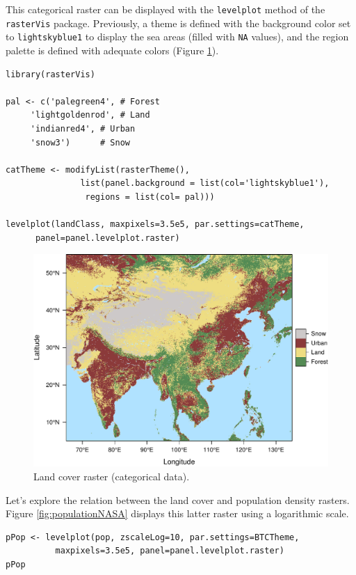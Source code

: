 This categorical raster can be displayed with the \texttt{levelplot} method
of the \texttt{rasterVis} package. Previously, a theme is defined with the
background color set to \texttt{lightskyblue1} to display the sea areas
(filled with \texttt{NA} values), and the region palette is defined with
adequate colors (Figure \ref{fig:landClass}).


\lstset{language=R,numbers=none}
\begin{lstlisting}
library(rasterVis)

pal <- c('palegreen4', # Forest
	 'lightgoldenrod', # Land
	 'indianred4', # Urban
	 'snow3')      # Snow

catTheme <- modifyList(rasterTheme(),
		       list(panel.background = list(col='lightskyblue1'),
			    regions = list(col= pal)))

levelplot(landClass, maxpixels=3.5e5, par.settings=catTheme,
	  panel=panel.levelplot.raster)
\end{lstlisting}

\begin{figure}[htb]
\centering
\includegraphics[width=.9\linewidth]{figs/landClass.pdf}
\caption{\label{fig:landClass}Land cover raster (categorical data).}
\end{figure}

Let's explore the relation between the land cover and population
density rasters. Figure \ref{fig:populationNASA} displays this
latter raster using a logarithmic scale.

\lstset{language=R,numbers=none}
\begin{lstlisting}
pPop <- levelplot(pop, zscaleLog=10, par.settings=BTCTheme,
		  maxpixels=3.5e5, panel=panel.levelplot.raster)
pPop
\end{lstlisting}

